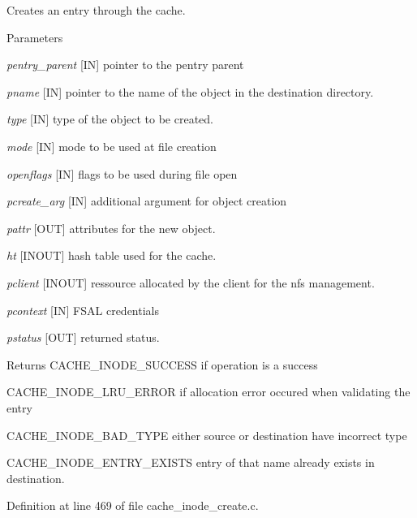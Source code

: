 Creates an entry through the cache.


\begin{DoxyParams}{Parameters}
\item[{\em pentry\_\-parent}][IN] pointer to the pentry parent \item[{\em pname}][IN] pointer to the name of the object in the destination directory. \item[{\em type}][IN] type of the object to be created. \item[{\em mode}][IN] mode to be used at file creation \item[{\em openflags}][IN] flags to be used during file open \item[{\em pcreate\_\-arg}][IN] additional argument for object creation \item[{\em pattr}][OUT] attributes for the new object. \item[{\em ht}][INOUT] hash table used for the cache. \item[{\em pclient}][INOUT] ressource allocated by the client for the nfs management. \item[{\em pcontext}][IN] FSAL credentials \item[{\em pstatus}][OUT] returned status.\end{DoxyParams}
\begin{DoxyReturn}{Returns}
CACHE\_\-INODE\_\-SUCCESS if operation is a success \par
 

CACHE\_\-INODE\_\-LRU\_\-ERROR if allocation error occured when validating the entry\par
 

CACHE\_\-INODE\_\-BAD\_\-TYPE either source or destination have incorrect type\par
 

CACHE\_\-INODE\_\-ENTRY\_\-EXISTS entry of that name already exists in destination. 
\end{DoxyReturn}


Definition at line 469 of file cache\_\-inode\_\-create.c.